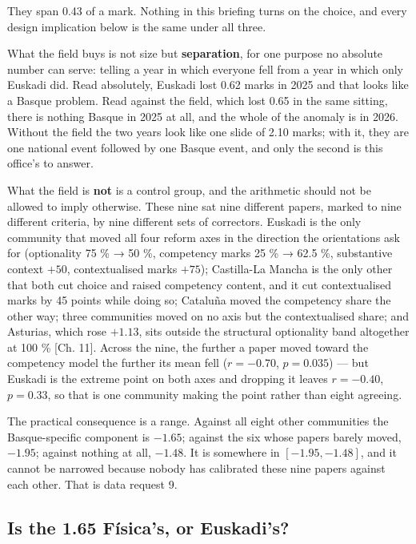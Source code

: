 \documentclass[
  10.5pt,
  a4paper,
  DIV=11,
  numbers=noendperiod]{scrartcl}
\begin{document}
They span 0.43 of a mark. Nothing in this briefing turns on the choice,
and every design implication below is the same under all three.

What the field buys is not size but \textbf{separation}, for one purpose
no absolute number can serve: telling a year in which everyone fell from
a year in which only Euskadi did. Read absolutely, Euskadi lost 0.62
marks in 2025 and that looks like a Basque problem. Read against the
field, which lost 0.65 in the same sitting, there is nothing Basque in
2025 at all, and the whole of the anomaly is in 2026. Without the field
the two years look like one slide of 2.10 marks; with it, they are one
national event followed by one Basque event, and only the second is this
office's to answer.

What the field is \textbf{not} is a control group, and the arithmetic
should not be allowed to imply otherwise. These nine sat nine different
papers, marked to nine different criteria, by nine different sets of
correctors. Euskadi is the only community that moved all four reform
axes in the direction the orientations ask for (optionality 75 \% → 50
\%, competency marks 25 \% → 62.5 \%, substantive context \(+50\),
contextualised marks \(+75\)); Castilla-La Mancha is the only other that
both cut choice and raised competency content, and it cut contextualised
marks by 45 points while doing so; Cataluña moved the competency share
the other way; three communities moved on no axis but the contextualised
share; and Asturias, which rose \(+1.13\), sits outside the structural
optionality band altogether at 100 \% {[}Ch. 11{]}. Across the nine, the
further a paper moved toward the competency model the further its mean
fell (\(r = -0.70\), \(p = 0.035\)) --- but Euskadi is the extreme point
on both axes and dropping it leaves \(r = -0.40\), \(p = 0.33\), so that
is one community making the point rather than eight agreeing.

The practical consequence is a range. Against all eight other
communities the Basque-specific component is \(-1.65\); against the six
whose papers barely moved, \(-1.95\); against nothing at all, \(-1.48\).
It is somewhere in \([-1.95, -1.48]\), and it cannot be narrowed because
nobody has calibrated these nine papers against each other. That is data
request 9.

\subsection{Is the 1.65 Física's, or
Euskadi's?}\label{is-the-1.65-fuxedsicas-or-euskadis}
\end{document}
